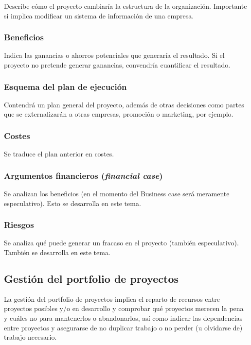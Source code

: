 \documentclass[12pt]{article}
\begin{document}
{Describe cómo el proyecto cambiaría la estructura de la organización. Importante si implica modificar un sistema de información de una empresa.}

\subsubsection{Beneficios}
\label{2.2.5}

{Indica las ganancias o ahorros potenciales que generaría el resultado. Si el proyecto no pretende generar ganancias, convendría cuantificar el resultado.}

\subsubsection{Esquema del plan de ejecución}
\label{2.2.6}

{Contendrá un plan general del proyecto, además de otras decisiones como partes que se externalizarán a otras empresas, promoción o marketing, por ejemplo.}

\subsubsection{Costes}
\label{2.2.7}

{Se traduce el plan anterior en costes.}

\subsubsection{Argumentos financieros (\textit{financial case})}
\label{2.2.8}

{Se analizan los beneficios (en el momento del Business case será meramente especulativo). Esto se desarrolla en este tema.}

\subsubsection{Riesgos}
\label{2.2.9}

{Se analiza qué puede generar un fracaso en el proyecto (también especulativo). También se desarrolla en este tema.}

\subsection{Gestión del portfolio de proyectos}
\label{2.3.0}

{La gestión del portfolio de proyectos implica el reparto de recursos entre proyectos posibles y/o en desarrollo y comprobar qué proyectos merecen la pena y cuáles no para mantenerlos o abandonarlos, así como indicar las dependencias entre proyectos y asegurarse de no duplicar trabajo o no perder (u olvidarse de) trabajo necesario.}
\end{document}
